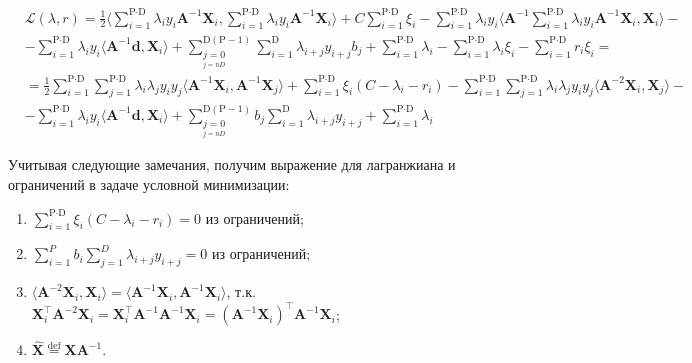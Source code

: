 \documentclass[CEJM,PDF]{Class+Reg_in_Molec_Docking} %
\begin{document}
\begin{equation}
\begin{aligned}
& \mathcal{L}(\lambda, r) = \frac{1}{2} \langle \sum_{i=1}^{\text{P}\cdot\text{D}}{\lambda_{i}y_{i}\mathbf{A}^{-1} \mathbf{X}_{i}}, \sum_{i=1}^{\text{P}\cdot\text{D}}{\lambda_{i}y_{i}\mathbf{A}^{-1} \mathbf{X}_{i}} \rangle + C\sum\limits_{i=1}^{\text{P}\cdot\text{D}}\xi_{i} - 
\sum_{i=1}^{\text{P}\cdot\text{D}}{\lambda_{i} y_{i}\langle \mathbf{A}^{-1} \sum_{i=1}^{\text{P}\cdot\text{D}}{\lambda_{i}y_{i} \mathbf{A}^{-1}  \mathbf{X}_{i}}, \mathbf{X}_{i}\rangle} - \\ 
& - \sum_{i=1}^{\text{P}\cdot\text{D}}{\lambda_{i} y_{i}\langle \mathbf{A}^{-1}\mathbf{d}, \mathbf{X}_{i} \rangle} + \sum_{\underset{{j=nD}}{j=0}}^{\text{D}(\text{P}-1)}\sum_{i=1}^{\text{D}}{\lambda_{i+j} y_{i+j}b_j} + \sum_{i=1}^{\text{P}\cdot\text{D}}{\lambda_{i}}  - \sum_{i=1}^{\text{P}\cdot\text{D}}{\lambda_{i}\xi_{i}}- \sum_{i=1}^{\text{P}\cdot\text{D}}{r_{i}\xi_{i}} = \\
& = \frac{1}{2} \sum_{i=1}^{\text{P}\cdot\text{D}}\sum_{j=1}^{\text{P}\cdot\text{D}} {\lambda_{i}\lambda_{j}y_{i}y_{j}\langle \mathbf{A}^{-1} \mathbf{X}_{i}, \mathbf{A}^{-1} \mathbf{X}_{j} \rangle} + \sum_{i=1}^{\text{P}\cdot\text{D}}{\xi_{i}(C - \lambda_{i} - r_{i})} - \sum_{i=1}^{\text{P}\cdot\text{D}}\sum_{j=1}^{\text{P}\cdot\text{D}} {\lambda_{i}\lambda_{j}y_{i}y_{j}\langle \mathbf{A}^{-2} \mathbf{X}_{i},  \mathbf{X}_{j} \rangle} - \\
& - \sum_{i=1}^{\text{P}\cdot\text{D}}{\lambda_{i} y_{i}\langle \mathbf{A}^{-1}\mathbf{d}, \mathbf{X}_{i} \rangle} + \sum_{\underset{{j=nD}}{j=0}}^{\text{D}(\text{P}-1)}b_j\sum_{i=1}^{\text{D}}{\lambda_{i+j} y_{i+j}} + \sum_{i=1}^{\text{P}\cdot\text{D}}{\lambda_{i}}
\end{aligned}
\end{equation}

Учитывая следующие замечания, получим выражение для лагранжиана и ограничений в задаче условной минимизации:

\begin{enumerate}
	\item $\sum\limits_{i=1}^{\text{P}\cdot\text{D}}{\xi_{i}(C - \lambda_{i} - r_{i})} = 0$ из ограничений;
	\item $\sum\limits_{i=1}^{P}{b_i \sum\limits_{j=1}^{D}{\lambda_{i+j} y_{i+j}}} = 0$ из ограничений;
	\item $\langle  \mathbf{A}^{-2} \mathbf{X}_i,  \mathbf{X}_i \rangle = \langle  \mathbf{A}^{-1} \mathbf{X}_i, \mathbf{A}^{-1} \mathbf{X}_i \rangle$, т.к. $\mathbf{X}_i^{\top}\mathbf{A}^{-2} \mathbf{X}_i =  \mathbf{X}_i^{\top}\mathbf{A}^{-1}\mathbf{A}^{-1} \mathbf{X}_i = (\mathbf{A}^{-1} \mathbf{X}_i)^{\top}\mathbf{A}^{-1} \mathbf{X}_i$;
	\item $\widehat{\mathbf{X}} \overset{\text{def}}{=} \mathbf{X}\mathbf{A}^{-1}$.
\end{enumerate}
\end{document}
